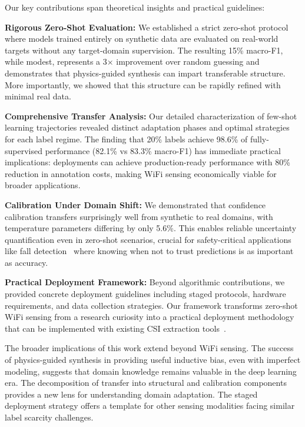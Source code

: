 \documentclass[journal]{IEEEtran}
\begin{document}
Our key contributions span theoretical insights and practical guidelines:

\textbf{Rigorous Zero-Shot Evaluation:} We established a strict zero-shot protocol where models trained entirely on synthetic data are evaluated on real-world targets without any target-domain supervision. The resulting 15\% macro-F1, while modest, represents a 3× improvement over random guessing and demonstrates that physics-guided synthesis can impart transferable structure. More importantly, we showed that this structure can be rapidly refined with minimal real data.

\textbf{Comprehensive Transfer Analysis:} Our detailed characterization of few-shot learning trajectories revealed distinct adaptation phases and optimal strategies for each label regime. The finding that 20\% labels achieve 98.6\% of fully-supervised performance (82.1\% vs 83.3\% macro-F1) has immediate practical implications: deployments can achieve production-ready performance with 80\% reduction in annotation costs, making WiFi sensing economically viable for broader applications.

\textbf{Calibration Under Domain Shift:} We demonstrated that confidence calibration transfers surprisingly well from synthetic to real domains, with temperature parameters differing by only 5.6\%. This enables reliable uncertainty quantification even in zero-shot scenarios, crucial for safety-critical applications like fall detection~\cite{wifall2016} where knowing when not to trust predictions is as important as accuracy.

\textbf{Practical Deployment Framework:} Beyond algorithmic contributions, we provided concrete deployment guidelines including staged protocols, hardware requirements, and data collection strategies. Our framework transforms zero-shot WiFi sensing from a research curiosity into a practical deployment methodology that can be implemented with existing CSI extraction tools~\cite{csi_tool2011}.

The broader implications of this work extend beyond WiFi sensing. The success of physics-guided synthesis in providing useful inductive bias, even with imperfect modeling, suggests that domain knowledge remains valuable in the deep learning era. The decomposition of transfer into structural and calibration components provides a new lens for understanding domain adaptation. The staged deployment strategy offers a template for other sensing modalities facing similar label scarcity challenges.
\end{document}
